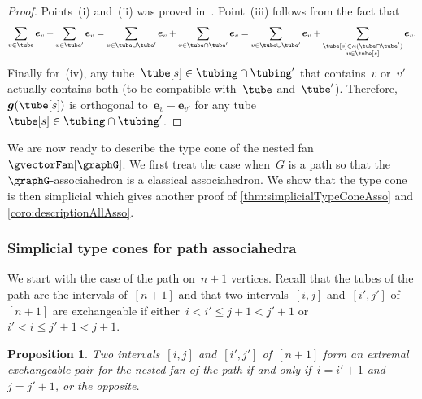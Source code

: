\documentclass{amsart}
\newtheorem{proposition}[theorem]{Proposition}
\theoremstyle{definition}
\renewcommand{\b}[1]{{\boldsymbol{#1}}} %
\newcommand{\gvector}[1]{\b{g}(#1)} %
\newcommand{\connectedComponents}{\kappa} %
\begin{document}
\begin{proof}
Points~(i) and~(ii) was proved in~\cite{MannevillePilaud-compatibilityFans}. Point~(iii) follows from the fact that
\[
\sum_{v \in \tube} \b{e}_v + \sum_{v \in \tube'} \b{e}_v = \sum_{v \in \tube \cup \tube'} \b{e}_v + \sum_{v \in \tube \cap \tube'} \b{e}_v = \sum_{v \in \tube \cup \tube'} \b{e}_v + \sum_{\substack{\tube[s] \in \connectedComponents(\tube \cap \tube') \\ v \in \tube[s]}} \b{e}_v.
\]
Finally for~(iv), any tube~$\tube[s] \in \tubing \cap \tubing'$ that contains~$v$ or~$v'$ actually contains both (to be compatible with~$\tube$ and~$\tube'$). Therefore, $\gvector{\tube[s]}$ is orthogonal to~$\b{e}_v - \b{e}_{v'}$ for any tube~$\tube[s] \in \tubing \cap \tubing'$.
\end{proof}

We are now ready to describe the type cone of the nested fan~$\gvectorFan[\graphG]$.
We first treat the case when~$G$ is a path so that the $\graphG$-associahedron is a classical associahedron.
We show that the type cone is then simplicial which gives another proof of \cref{thm:simplicialTypeConeAsso} and \cref{coro:descriptionAllAsso}.

\subsubsection{Simplicial type cones for path associahedra}

We start with the case of the path on~$n+1$ vertices.
Recall that the tubes of the path are the intervals of~$[n+1]$ and that two intervals~$[i,j]$ and~$[i',j']$ of~$[n+1]$ are exchangeable if either~${i < i' \le j+1 < j'+1}$ or~${i' < i \le j'+1 < j+1}$.

\begin{proposition}
\label{prop:extremalExchangeablePairsA}
Two intervals~$[i,j]$ and~$[i',j']$ of~$[n+1]$ form an extremal exchangeable pair for the nested fan of the path if and only if~$i = i'+1$ and~$j = j'+1$, or the opposite.
\end{proposition}
\end{document}
